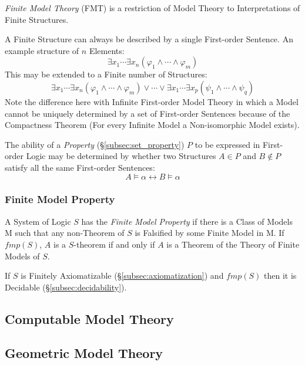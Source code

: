 \documentclass{article}
\begin{document}
\emph{Finite Model Theory} (FMT) is a restriction of Model Theory to
Interpretations of Finite Structures.

A Finite Structure can always be described by a single First-order
Sentence. An example structure of $n$ Elements:
\[
    \exists x_1 \cdots \exists x_n ( \varphi_1 \wedge \cdots \wedge
    \varphi_m )
\]
This may be extended to a Finite number of Structures:
\[
    \exists x_1 \cdots \exists x_n ( \varphi_1 \wedge \cdots \wedge
    \varphi_m )
    \vee
    \cdots
    \vee
    \exists x_1 \cdots \exists x_p ( \psi_1 \wedge \cdots \wedge
    \psi_q )
\]
Note the difference here with Infinite First-order Model Theory in
which a Model cannot be uniquely determined by a set of First-order
Sentences because of the Compactness Theorem (For every Infinite Model
a Non-isomorphic Model exists).

The ability of a \emph{Property} (\S\ref{subsec:set_property}) $P$ to
be expressed in First-order Logic may be determined by whether two
Structures $A \in P$ and $B \notin P$ satisfy all the same First-order
Sentences:
\[
    A \vDash \alpha \leftrightarrow B \vDash \alpha
\]

\subsubsection{Finite Model Property}

A System of Logic $S$ has the \emph{Finite Model Property} if there is
a Class of Models $\mathrm{M}$ such that any non-Theorem of $S$ is
Falsified by some Finite Model in $\mathrm{M}$. If $fmp(S)$, $A$ is a
$S$-theorem if and only if $A$ is a Theorem of the Theory of Finite
Models of $S$.

If $S$ is Finitely Axiomatizable (\S\ref{subsec:axiomatization}) and
$fmp(S)$ then it is Decidable (\S\ref{subsec:decidability}).

\subsection{Computable Model Theory}\label{subsec:computable_model_theory}

\cite{harizanov98}

\subsection{Geometric Model Theory}
\end{document}
